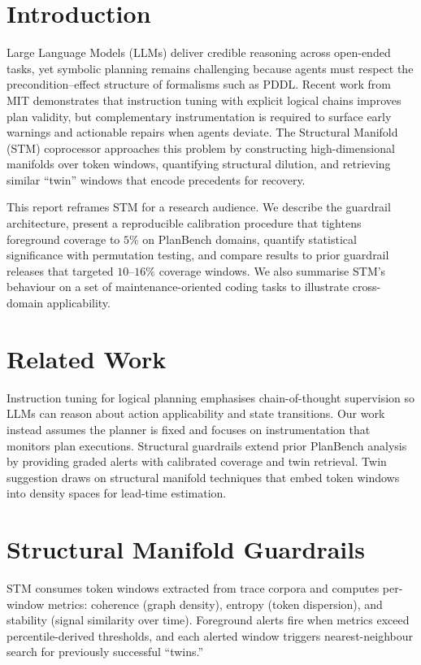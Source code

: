 \documentclass[11pt]{article}
\begin{document}
\section{Introduction}
Large Language Models (LLMs) deliver credible reasoning across open-ended
tasks, yet symbolic planning remains challenging because agents must respect the
precondition--effect structure of formalisms such as PDDL. Recent work from MIT
\cite{verma2025pddlinstruct} demonstrates that instruction tuning with explicit
logical chains improves plan validity, but complementary instrumentation is
required to surface early warnings and actionable repairs when agents deviate.
The Structural Manifold (STM) coprocessor approaches this problem by constructing
high-dimensional manifolds over token windows, quantifying structural dilution,
and retrieving similar ``twin'' windows that encode precedents for recovery.

This report reframes STM for a research audience. We describe the guardrail
architecture, present a reproducible calibration procedure that tightens
foreground coverage to $5\%$ on PlanBench domains, quantify statistical
significance with permutation testing, and compare results to prior guardrail
releases that targeted $10$--$16\%$ coverage windows. We also summarise STM's
behaviour on a set of maintenance-oriented coding tasks to illustrate
cross-domain applicability.

\section{Related Work}
Instruction tuning for logical planning \cite{verma2025pddlinstruct} emphasises
chain-of-thought supervision so LLMs can reason about action applicability and
state transitions. Our work instead assumes the planner is fixed and focuses on
instrumentation that monitors plan executions. Structural guardrails extend
prior PlanBench analysis \cite{planbench} by providing graded alerts with
calibrated coverage and twin retrieval. Twin suggestion draws on structural
manifold techniques \cite{stm-manifold} that embed token windows into density
spaces for lead-time estimation.

\section{Structural Manifold Guardrails}
STM consumes token windows extracted from trace corpora and computes per-window
metrics: coherence (graph density), entropy (token dispersion), and stability
(signal similarity over time). Foreground alerts fire when metrics exceed
percentile-derived thresholds, and each alerted window triggers nearest-neighbour
search for previously successful ``twins.''
\end{document}
